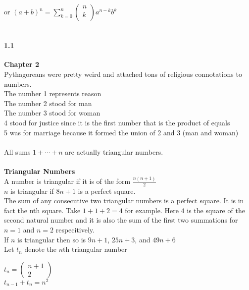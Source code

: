 \documentclass[14pt]{extreport}
\begin{document}
or $(a+b)^n = \sum_{k=0}^n \begin{pmatrix} n \\ k \\\end{pmatrix} a^{n-k}b^k$\\\\

\paragraph{1.1} \textbf{Chapter 2}\\

Pythagoreans were pretty weird and attached tons of religious connotations to numbers.\\
The number 1 represents reason\\
The number 2 stood for man\\
The number 3 stood for woman\\
4 stood for justice since it is the first number that is the product of equals\\
5 was for marriage because it formed the union of 2 and 3 (man and woman)\\\\

All sums $1 + \cdots + n$ are actually triangular numbers.\\\\

\textbf{Triangular Numbers}\\
A number is triangular if it is of the form $\frac{n(n+1)}{2}$\\
$n$ is triangular if $8n+1$ is a perfect square.\\
The sum of any consecutive two triangular numbers is a perfect square. It is in fact the nth square. Take $1+1+2=4$ for example. Here $4$ is the square of the second natural number and it is also the sum of the first two summations for $n=1$ and $n=2$ respecitively.\\
If $n$ is triangular then so is $9n+1$, $25n + 3$, and $49n+6$\\

Let $t_n$ denote the $n$th triangular number

$t_n = \begin{pmatrix} n+1 \\ 2 \end{pmatrix}$\\

$t_{n-1} + t_n = n^2$\\
\end{document}
